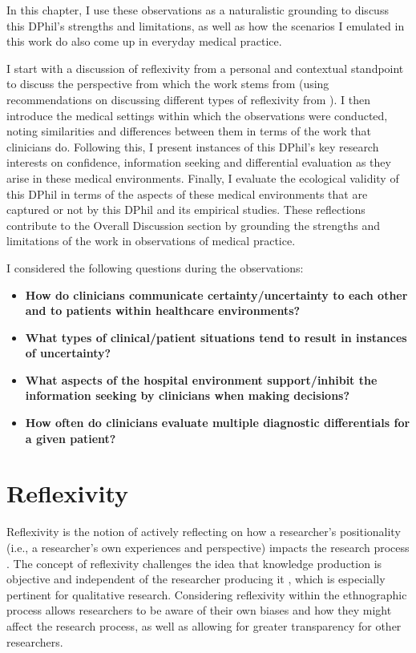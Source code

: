 \documentclass[a4paper, nobind]{templates/ociamthesis}
\providecommand{\tightlist}{%
  \setlength{\itemsep}{0pt}\setlength{\parskip}{0pt}}
\begin{document}
\hfill\break
In this chapter, I use these observations as a naturalistic grounding to discuss this DPhil's strengths and limitations, as well as how the scenarios I emulated in this work do also come up in everyday medical practice.

\hfill\break
I start with a discussion of reflexivity from a personal and contextual standpoint to discuss the perspective from which the work stems from (using recommendations on discussing different types of reflexivity from \autocite{olmos-vega_practical_2023}). I then introduce the medical settings within which the observations were conducted, noting similarities and differences between them in terms of the work that clinicians do. Following this, I present instances of this DPhil's key research interests on confidence, information seeking and differential evaluation as they arise in these medical environments. Finally, I evaluate the ecological validity of this DPhil in terms of the aspects of these medical environments that are captured or not by this DPhil and its empirical studies. These reflections contribute to the Overall Discussion section by grounding the strengths and limitations of the work in observations of medical practice.

\hfill\break
I considered the following questions during the observations:

\begin{itemize}
\tightlist
\item
  \textbf{How do clinicians communicate certainty/uncertainty to each other and to patients within healthcare environments?}
\item
  \textbf{What types of clinical/patient situations tend to result in instances of uncertainty?}
\item
  \textbf{What aspects of the hospital environment support/inhibit the information seeking by clinicians when making decisions?}
\item
  \textbf{How often do clinicians evaluate multiple diagnostic differentials for a given patient?}
\end{itemize}

\section{Reflexivity}\label{reflexivity}

Reflexivity is the notion of actively reflecting on how a researcher's positionality (i.e., a researcher's own experiences and perspective) impacts the research process \autocite{lazard2020}. The concept of reflexivity challenges the idea that knowledge production is objective and independent of the researcher producing it \autocite{berger2015}, which is especially pertinent for qualitative research. Considering reflexivity within the ethnographic process allows researchers to be aware of their own biases and how they might affect the research process, as well as allowing for greater transparency for other researchers.
\end{document}

